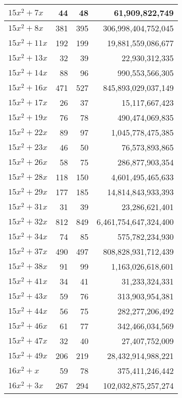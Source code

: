 \documentclass[a4paper]{amsproc}
\theoremstyle{plain}
\begin{document}
\begin{longtable}{ | l | r | r | r | }
$15x^2 + 7x$ & 44 & 48 & 61{,}909{,}822{,}749 \\ \hline
$15x^2 + 8x$ & 381 & 395 & 306{,}998{,}404{,}752{,}045 \\ \hline
$15x^2 + 11x$ & 192 & 199 & 19{,}881{,}559{,}086{,}677 \\ \hline
$15x^2 + 13x$ & 32 & 39 & 22{,}930{,}312{,}335 \\ \hline
$15x^2 + 14x$ & 88 & 96 & 990{,}553{,}566{,}305 \\ \hline
$15x^2 + 16x$ & 471 & 527 & 845{,}893{,}029{,}037{,}149 \\ \hline
$15x^2 + 17x$ & 26 & 37 & 15{,}117{,}667{,}423 \\ \hline
$15x^2 + 19x$ & 76 & 78 & 490{,}474{,}069{,}835 \\ \hline
$15x^2 + 22x$ & 89 & 97 & 1{,}045{,}778{,}475{,}385 \\ \hline
$15x^2 + 23x$ & 46 & 50 & 76{,}573{,}893{,}865 \\ \hline
$15x^2 + 26x$ & 58 & 75 & 286{,}877{,}903{,}354 \\ \hline
$15x^2 + 28x$ & 118 & 150 & 4{,}601{,}495{,}465{,}633 \\ \hline
$15x^2 + 29x$ & 177 & 185 & 14{,}814{,}843{,}933{,}393 \\ \hline
$15x^2 + 31x$ & 31 & 39 & 23{,}286{,}621{,}401 \\ \hline
$15x^2 + 32x$ & 812 & 849 & 6{,}461{,}754{,}647{,}324{,}400 \\ \hline
$15x^2 + 34x$ & 74 & 85 & 575{,}782{,}234{,}930 \\ \hline
$15x^2 + 37x$ & 490 & 497 & 808{,}828{,}931{,}712{,}439 \\ \hline
$15x^2 + 38x$ & 91 & 99 & 1{,}163{,}026{,}618{,}601 \\ \hline
$15x^2 + 41x$ & 34 & 41 & 31{,}233{,}324{,}331 \\ \hline
$15x^2 + 43x$ & 59 & 76 & 313{,}903{,}954{,}381 \\ \hline
$15x^2 + 44x$ & 56 & 75 & 282{,}277{,}206{,}492 \\ \hline
$15x^2 + 46x$ & 61 & 77 & 342{,}466{,}034{,}569 \\ \hline
$15x^2 + 47x$ & 32 & 40 & 27{,}407{,}752{,}009 \\ \hline
$15x^2 + 49x$ & 206 & 219 & 28{,}432{,}914{,}988{,}221 \\ \hline
$16x^2 + x$ & 59 & 78 & 375{,}411{,}246{,}442 \\ \hline
$16x^2 + 3x$ & 267 & 294 & 102{,}032{,}875{,}257{,}274 \\ \hline

\end{longtable}
\end{document}
